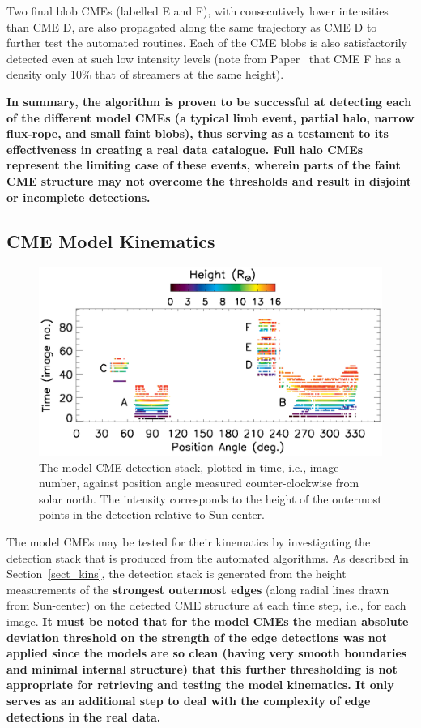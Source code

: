 \documentclass[preprint2]{aastex}
\newcommand{\RNum}[1]{\uppercase\expandafter{\romannumeral #1\relax}}
\begin{document}
Two final blob CMEs (labelled E and F), with consecutively lower intensities than CME D, are also propagated along the same trajectory as CME D to further test the automated routines. Each of the CME blobs is also satisfactorily detected even at such low intensity levels (note from Paper~\RNum{1} that CME F has a density only 10\% that of streamers at the same height).

{\bf In summary, the algorithm is proven to be successful at detecting each of the different model CMEs (a typical limb event, partial halo, narrow flux-rope, and small faint blobs), thus serving as a testament to its effectiveness in creating a real data catalogue. Full halo CMEs represent the limiting case of these events, wherein parts of the faint CME structure may not overcome the thresholds and result in disjoint or incomplete detections.}


\subsection{CME Model Kinematics}

\begin{figure}[!t]
\centerline{\includegraphics[scale=0.57, clip=true, trim=0 0 0 0, width=\linewidth]{figure_model_stack.eps}}
\caption{The model CME detection stack, plotted in time, i.e., image number, against position angle measured counter-clockwise from solar north. The intensity corresponds to the height of the outermost points in the detection relative to Sun-center.}
\label{figure_model_stack}
\end{figure}

The model CMEs may be tested for their kinematics by investigating the detection stack that is produced from the automated algorithms. As described in Section~\ref{sect_kins}, the detection stack is generated from the height measurements of the {\bf strongest outermost edges} (along radial lines drawn from Sun-center) on the detected CME structure at each time step, i.e., for each image. {\bf It must be noted that for the model CMEs the median absolute deviation threshold on the strength of the edge detections was not applied since the models are so clean (having very smooth boundaries and minimal internal structure) that this further thresholding is not appropriate for retrieving and testing the model kinematics. It only serves as an additional step to deal with the complexity of edge detections in the real data.}
\end{document}
